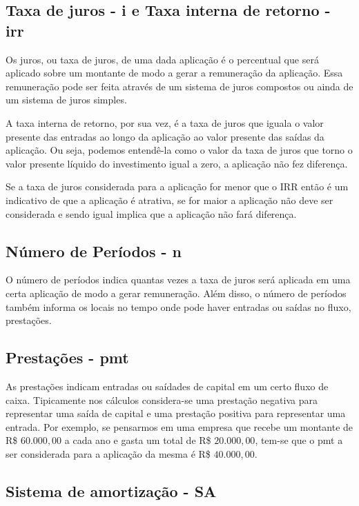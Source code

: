 \subsection{Taxa de juros - i e Taxa interna de retorno - irr}

Os juros, ou taxa de juros, de uma dada aplicação é o percentual que será aplicado sobre um montante de modo a gerar a remuneração da aplicação. Essa remuneração pode ser feita através de um sistema de juros compostos ou ainda de um sistema de juros simples.

A taxa interna de retorno, por sua vez, é a taxa de juros que iguala o valor presente das entradas ao longo da aplicação ao valor presente das saídas da aplicação. Ou seja, podemos entendê-la como o valor da taxa de juros que torno o valor presente líquido do investimento igual a zero, a aplicação não fez diferença.

Se a taxa de juros considerada para a aplicação for menor que o IRR então é um indicativo de que a aplicação é atrativa, se for maior a aplicação não deve ser considerada e sendo igual implica que a aplicação não fará diferença.

\subsection{Número de Períodos - n}

O número de períodos indica quantas vezes a taxa de juros será aplicada em uma certa aplicação de modo a gerar remuneração. Além disso, o número de períodos também informa os locais no tempo onde pode haver entradas ou saídas no fluxo, prestações.

\subsection{Prestações - pmt}

As prestações indicam entradas ou saídades de capital em um certo fluxo de caixa. Tipicamente nos cálculos considera-se uma prestação negativa para representar uma saída de capital e uma prestação positiva para representar uma entrada. Por exemplo, se pensarmos em uma empresa que recebe um montante de R\$ $60.000,00$ a cada ano e gasta um total de R\$ $20.000,00$, tem-se que o pmt a ser considerada para a aplicação da mesma é R\$ $40.000,00$.


\subsection{Sistema de amortização - SA}

